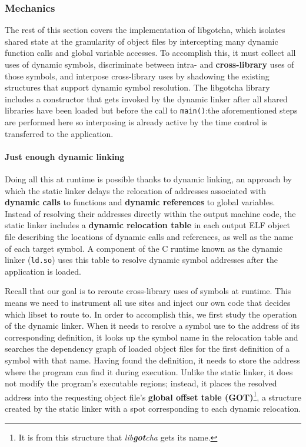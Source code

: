 \subsubsection{Mechanics}

The rest of this section covers the implementation of libgotcha, which isolates
shared state at the granularity of object files by intercepting many dynamic function
calls and global variable accesses.  To accomplish this, it must collect all uses of
dynamic symbols, discriminate between intra- and \textbf{cross-library} uses of those
symbols, and interpose cross-library uses by shadowing the existing structures that
support dynamic symbol resolution.  The libgotcha library includes a constructor that
gets invoked by the dynamic linker after all shared libraries have been loaded but
before the call to \texttt{main()}:\@ the aforementioned steps are performed here so
interposing is already active by the time control is transferred to the application.

\paragraph{Just enough dynamic linking}

Doing all this at runtime is possible thanks to dynamic linking, an
approach by which the static linker delays the relocation of addresses associated
with \textbf{dynamic calls} to functions and \textbf{dynamic references} to global
variables.  Instead of resolving their addresses directly within the output machine
code, the static linker includes a
\textbf{dynamic relocation table} in each output ELF object file describing the
locations of dynamic calls and references, as well as the name of each target symbol.
A component of the C runtime known as the dynamic linker (\texttt{ld.so}) uses this
table to resolve dynamic symbol addresses after the application is loaded.

Recall that our goal is to reroute cross-library uses of symbols at runtime.  This
means we need to instrument all use sites and inject our own code that decides which
libset to route to.  In order to accomplish this, we first study the operation of the
dynamic linker.  When it needs to resolve a symbol use to the address of its
corresponding definition, it looks up the symbol name in the relocation table and
searches the dependency graph of loaded object files for the first definition of a
symbol with that name.  Having found the definition, it needs to store the address
where the program can find it during execution.  Unlike the static linker, it does
not modify the program's executable regions; instead, it places the resolved address
into the requesting object file's \textbf{global offset table (GOT)}\footnote{It is
from this structure that \textit{lib\textbf{got}cha} gets its name.}, a structure
created by the static linker with a spot corresponding to each dynamic relocation.

